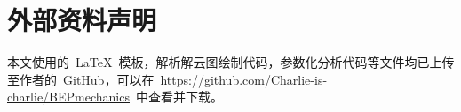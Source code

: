 \chapter{外部资料声明}
\label{cha:statement}
本文使用的~\LaTeX{}~模板，解析解云图绘制代码，参数化分析代码等文件均已上传至作者的~GitHub，可以在~\url{https://github.com/Charlie-is-charlie/BEPmechanics}~中查看并下载。